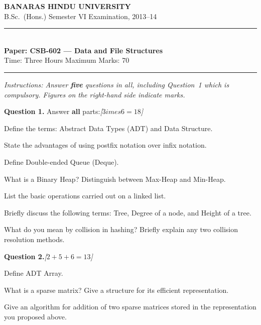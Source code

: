 \documentclass[11pt,a4paper]{article}
\newcommand{\pts}[1]{\hfill   \textit{[#1]}}
\begin{document}
\begin{center}
  {\large\bfseries BANARAS HINDU UNIVERSITY}\\[2pt]
  {
\normalsize B.Sc.\ (Hons.) Semester VI Examination, 2013--14}\\[6pt]
  \rule{0.8\linewidth}{0.5pt}\\[6pt]
  {\large\bfseries Paper: CSB-602 --- Data and File Structures}\\[4pt]
  {
\normalsize Time: Three Hours \hfill Maximum Marks: 70}
\end{center}

\rule{\linewidth}{0.4pt}

\smallskip



\noindent   \textit{Instructions: Answer   \textbf{five} questions in all, including Question~1 which is compulsory. Figures on the right-hand side indicate marks.}

\bigskip




\noindent   \textbf{Question 1.} Answer   \textbf{all} parts:\pts{$3 imes6=18$}

\begin{parts}
  \item Define the terms: Abstract Data Types (ADT) and Data Structure.
  \item State the advantages of using postfix notation over infix notation.
  \item Define Double-ended Queue (Deque).
  \item What is a Binary Heap? Distinguish between Max-Heap and Min-Heap.
  \item List the basic operations carried out on a linked list.
  \item Briefly discuss the following terms: Tree, Degree of a node, and Height of a tree.
  \item What do you mean by collision in hashing? Briefly explain any two collision resolution methods.
\end{parts}

\bigskip




\noindent   \textbf{Question 2.}\pts{$2+5+6=13$}

\begin{parts}
  \item Define ADT Array.
  \item What is a sparse matrix? Give a structure for its efficient representation.
  \item Give an algorithm for addition of two sparse matrices stored in the representation you proposed above.
\end{parts}
\end{document}
